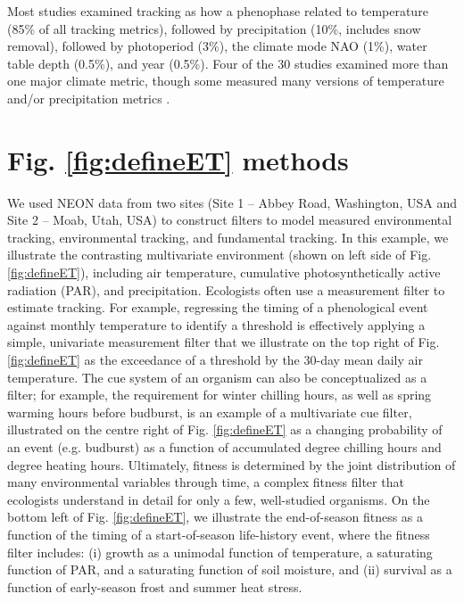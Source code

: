 \documentclass[11pt,letter]{article}
\begin{document}
Most studies examined tracking as how a phenophase related to temperature (85\% of all tracking metrics), followed by precipitation (10\%, includes snow removal), followed by photoperiod (3\%), the climate mode NAO (1\%), water table depth (0.5\%), and year (0.5\%). Four of the 30 studies examined more than one major climate metric, though some measured many versions of temperature and/or precipitation metrics \citep[e.g., 15 precipitation and/or temperature metrics considered in][]{munson2017}.

\section{Fig. \ref{fig:defineET} methods}
We used NEON data from two sites (Site 1 -- Abbey Road, Washington, USA and Site 2 -- Moab, Utah, USA) to construct filters to model measured environmental tracking, environmental tracking, and fundamental tracking. In this example, we illustrate the contrasting multivariate environment (shown on left side of Fig. \ref{fig:defineET}), including air temperature, cumulative photosynthetically active radiation (PAR), and precipitation.  Ecologists often use a measurement filter to estimate tracking.  For example, regressing the timing of a phenological event against monthly temperature to identify a threshold is effectively applying a simple, univariate measurement filter that we illustrate on the top right of Fig. \ref{fig:defineET} as the exceedance of a threshold by the 30-day mean daily air temperature.  The cue system of an organism can also be conceptualized as a filter; for example, the requirement for winter chilling hours, as well as spring warming hours before budburst, is an example of a multivariate cue filter, illustrated on the centre right of Fig. \ref{fig:defineET} as a changing probability of an event (e.g. budburst) as a function of accumulated degree chilling hours and degree heating hours. Ultimately, fitness is determined by the joint distribution of many environmental variables through time, a complex fitness filter that ecologists understand in detail for only a few, well-studied organisms.  On the bottom left of Fig. \ref{fig:defineET}, we illustrate the end-of-season fitness as a function of the timing of a start-of-season life-history event, where the fitness filter includes: (i) growth as a unimodal function of temperature, a saturating function of PAR, and a saturating function of soil moisture, and (ii) survival as a function of early-season frost and summer heat stress. %
\end{document}
